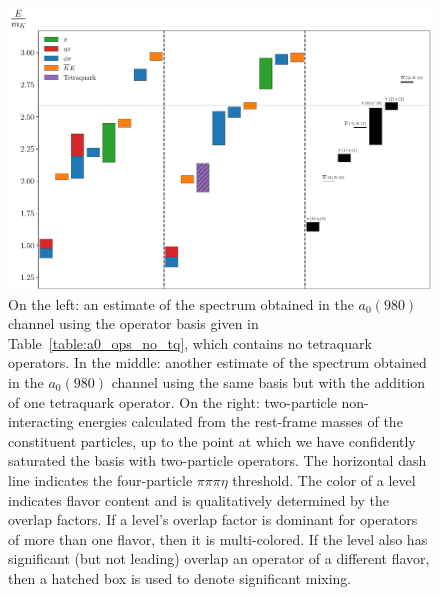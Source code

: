 \begin{figure}
  \centering
  \hspace*{-0.5in}\includegraphics[width=\textwidth]{figures/spectrum_a1gm/staircase.pdf}
  \caption{On the left: an estimate of the spectrum obtained in the $a_0(980)$ channel using the operator basis given in Table~\ref{table:a0_ops_no_tq}, which contains no tetraquark operators. In the middle: another estimate of the spectrum obtained in the $a_0(980)$ channel using the same basis but with the addition of one tetraquark operator. On the right: two-particle non-interacting energies calculated from the rest-frame masses of the constituent particles, up to the point at which we have confidently saturated the basis with two-particle operators. The horizontal dash line indicates the four-particle $\pi\pi\pi\eta$ threshold. The color of a level indicates flavor content and is qualitatively determined by the overlap factors. If a level's overlap factor is dominant for operators of more than one flavor, then it is multi-colored. If the level also has significant (but not leading) overlap an operator of a different flavor, then a hatched box is used to denote significant mixing.}
  \label{fig:a0_spectrum}
\end{figure}